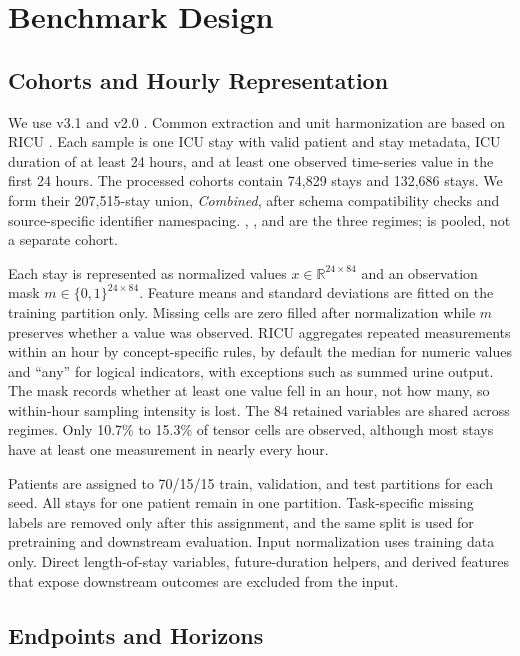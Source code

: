 \section{Benchmark Design}
\label{sec:design}

\subsection{Cohorts and Hourly Representation}

We use \MIMIC{} v3.1 and \EICU{} v2.0 \citep{johnson2023mimiciv,pollard2018eicu}. Common extraction and unit harmonization are based on RICU \citep{bennett2023ricu}. Each sample is one ICU stay with valid patient and stay metadata, ICU duration of at least 24 hours, and at least one observed time-series value in the first 24 hours. The processed cohorts contain 74,829 \MIMIC{} stays and 132,686 \EICU{} stays. We form their 207,515-stay union, \emph{Combined}, after schema compatibility checks and source-specific identifier namespacing. \MIMIC{}, \EICU{}, and \Combined{} are the three regimes; \Combined{} is pooled, not a separate cohort.

Each stay is represented as normalized values $x\in\mathbb{R}^{24\times84}$ and an observation mask $m\in\{0,1\}^{24\times84}$. Feature means and standard deviations are fitted on the training partition only. Missing cells are zero filled after normalization while $m$ preserves whether a value was observed. RICU aggregates repeated measurements within an hour by concept-specific rules, by default the median for numeric values and ``any'' for logical indicators, with exceptions such as summed urine output. The mask records whether at least one value fell in an hour, not how many, so within-hour sampling intensity is lost. The 84 retained variables are shared across regimes. Only 10.7\% to 15.3\% of tensor cells are observed, although most stays have at least one measurement in nearly every hour.

Patients are assigned to 70/15/15 train, validation, and test partitions for each seed. All stays for one patient remain in one partition. Task-specific missing labels are removed only after this assignment, and the same split is used for pretraining and downstream evaluation. Input normalization uses training data only. Direct length-of-stay variables, future-duration helpers, and derived features that expose downstream outcomes are excluded from the input.

\subsection{Endpoints and Horizons}

